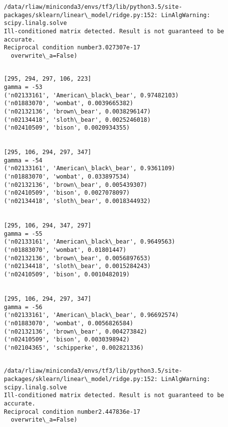 \documentclass[11pt]{article}
\begin{document}
    \begin{Verbatim}[commandchars=\\\{\}]
/data/rliaw/miniconda3/envs/tf3/lib/python3.5/site-packages/sklearn/linear\_model/ridge.py:152: LinAlgWarning: scipy.linalg.solve
Ill-conditioned matrix detected. Result is not guaranteed to be accurate.
Reciprocal condition number3.027307e-17
  overwrite\_a=False)

    \end{Verbatim}

    \begin{Verbatim}[commandchars=\\\{\}]

[295, 294, 297, 106, 223]
gamma = -53
('n02133161', 'American\_black\_bear', 0.97482103)
('n01883070', 'wombat', 0.0039665382)
('n02132136', 'brown\_bear', 0.0038296147)
('n02134418', 'sloth\_bear', 0.0025246018)
('n02410509', 'bison', 0.0020934355)


[295, 106, 294, 297, 347]
gamma = -54
('n02133161', 'American\_black\_bear', 0.9361109)
('n01883070', 'wombat', 0.033897534)
('n02132136', 'brown\_bear', 0.005439307)
('n02410509', 'bison', 0.0027078097)
('n02134418', 'sloth\_bear', 0.0018344932)


[295, 106, 294, 347, 297]
gamma = -55
('n02133161', 'American\_black\_bear', 0.9649563)
('n01883070', 'wombat', 0.01801447)
('n02132136', 'brown\_bear', 0.0056897653)
('n02134418', 'sloth\_bear', 0.0015284243)
('n02410509', 'bison', 0.0010482019)


[295, 106, 294, 297, 347]
gamma = -56
('n02133161', 'American\_black\_bear', 0.96692574)
('n01883070', 'wombat', 0.0056826584)
('n02132136', 'brown\_bear', 0.004273842)
('n02410509', 'bison', 0.0030398942)
('n02104365', 'schipperke', 0.002821336)


    \end{Verbatim}

    \begin{Verbatim}[commandchars=\\\{\}]
/data/rliaw/miniconda3/envs/tf3/lib/python3.5/site-packages/sklearn/linear\_model/ridge.py:152: LinAlgWarning: scipy.linalg.solve
Ill-conditioned matrix detected. Result is not guaranteed to be accurate.
Reciprocal condition number2.447836e-17
  overwrite\_a=False)

    \end{Verbatim}
\end{document}
